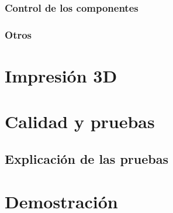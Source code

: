 \subsection{Control de los componentes}

\subsection{Otros}


\chapter{Impresión 3D}
% 
% 
% 

\chapter{Calidad y pruebas}

% 
\section{Explicación de las pruebas}

%
%

\chapter{Demostración}

